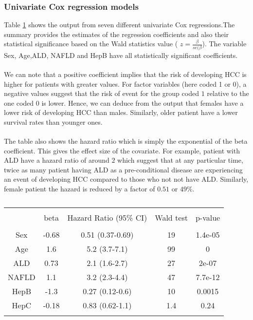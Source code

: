 \documentclass[11pt,twoside]{article}
\numberwithin{Theorem}{section}
\numberwithin{Definition}{section}
\numberwithin{Lemma}{section}
\numberwithin{Algorithm}{section}
\numberwithin{equation}{section}
\begin{document}
\subsubsection{Univariate Cox regression models}
%
%
Table \ref{table:univariate_cox} shows the output from seven different univariate Cox regressions.The summary provides the estimates of the regression coefficients and also their statistical significance based on the Wald statistics value ( $z=\frac{\beta}{se(\beta}$). The variable Sex, Age,ALD, NAFLD and HepB have all statistically significant coefficients. \\
\\
We can note that a positive coefficient implies that the risk of developing HCC is higher for patients with greater values. For factor variables (here coded 1 or 0), a negative values suggest that the risk of event for the group coded $1$ relative to the one coded $0$ is lower. Hence, we can deduce from the output that females have a lower risk of developing HCC than males. Similarly, older patient have a lower survival rates than younger ones. \\
\\
The table also shows the hazard ratio which is simply the exponential of the beta coefficient. This gives the effect size of the covariate. For example, patient with ALD have a hazard ratio of around $2$ which suggest that at any particular time, twice as many patient having ALD as a pre-conditional disease are experiencing an event of developing HCC compared to those who not not have ALD. Similarly, female patient the hazard is reduced by a factor of $0.51$ or $49\%$.
%
\begin{table}[!htbp] \centering
  \caption{}
  \label{table:univariate_cox}
\begin{tabular}{@{\extracolsep{5pt}} ccccc}
\\[-1.8ex]\hline
\hline \\[-1.8ex]
 & beta & Hazard Ratio (95\% CI) & Wald test & p-value \\
\hline \\[-1.8ex]
Sex & -0.68 & 0.51 (0.37-0.69) & 19 & 1.4e-05 \\
Age & 1.6 & 5.2 (3.7-7.1) & 99 & 0 \\
ALD & 0.73 & 2.1 (1.6-2.7) & 27 & 2e-07 \\
NAFLD & 1.1 & 3.2 (2.3-4.4) & 47 & 7.7e-12 \\
HepB & -1.3 & 0.27 (0.12-0.6) & 10 & 0.0015 \\
HepC & -0.18 & 0.83 (0.62-1.1) & 1.4 & 0.24 \\
\hline \\[-1.8ex]
\end{tabular}
\end{table}
\end{document}
